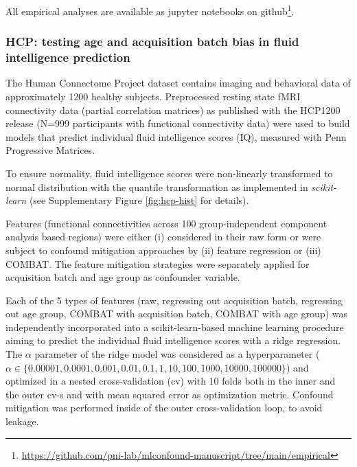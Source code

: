 \documentclass{article}
\begin{document}
All empirical analyses are available as jupyter notebooks on github\footnote{\href{https://github.com/pni-lab/mlconfound-manuscript/tree/main/empirical}{https://github.com/pni-lab/mlconfound-manuscript/tree/main/empirical}}.

\subsubsection*{HCP: testing age and acquisition batch bias in fluid intelligence prediction}

The Human Connectome Project dataset contains imaging and behavioral data of approximately 1200 healthy subjects\citep{van2013wu}. Preprocessed resting state fMRI connectivity data (partial correlation matrices)\citep{glasser2013minimal} as published with the HCP1200 release (N=999 participants with functional connectivity data) were used to build models that predict individual fluid intelligence scores (IQ), measured with Penn Progressive Matrices\citep{duncan2000neural}.

To ensure normality, fluid intelligence scores were non-linearly transformed to normal distribution with the quantile transformation\citep{beasley2009rank} as implemented in \emph{scikit-learn}\citep{pedregosa2011scikit} (see Supplementary Figure \ref{fig:hcp-hist} for details).

Features (functional connectivities across 100 group-independent component analysis based regions) were either (i) considered in their raw form or were subject to confound mitigation approaches by (ii) feature regression\citep{rao2017predictive} or (iii) COMBAT\citep{johnson2007adjusting, fortin2018harmonization}.
The feature mitigation strategies were separately applied for acquisition batch and age group as confounder variable.

Each of the 5 types of features (raw, regressing out acquisition batch, regressing out age group, COMBAT with acquisition batch, COMBAT with age group) was independently incorporated into a scikit-learn-based\citep{pedregosa2011scikit} machine learning procedure aiming to predict the individual fluid intelligence scores with a ridge regression\citep{hoerl1970ridge}. The $\alpha$ parameter of the ridge model was considered as a hyperparameter ($\alpha \in \{0.00001, 0.0001, 0.001, 0.01, 0.1, 1, 10, 100, 1000, 10000, 100000\}$) and optimized in a nested cross-validation (cv) with 10 folds both in the inner and the outer cv-s and with mean squared error as optimization metric. Confound mitigation was performed inside of the outer cross-validation loop, to avoid leakage.
\end{document}
